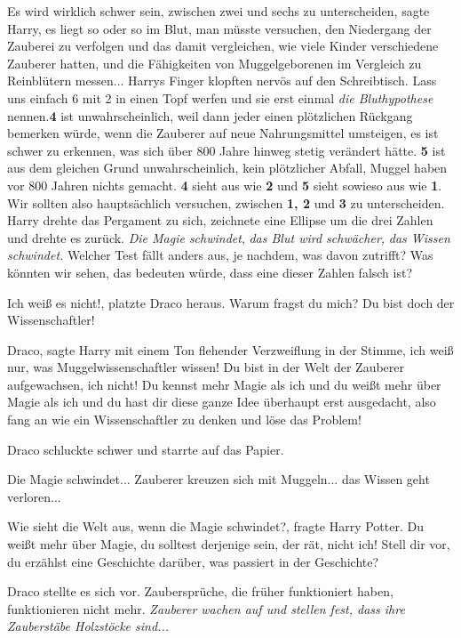 \glqq Es wird wirklich schwer sein, zwischen zwei und sechs zu
unterscheiden\grqq{}, sagte Harry, \glqq es liegt so oder so im Blut, man müsste
versuchen, den Niedergang der Zauberei zu verfolgen und das damit vergleichen,
wie viele Kinder verschiedene Zauberer hatten, und die Fähigkeiten von
Muggelgeborenen im Vergleich zu Reinblütern messen...\grqq{} Harrys Finger
klopften nervös auf den Schreibtisch. \glqq Lass uns einfach 6 mit 2 in einen
Topf werfen und sie erst einmal \emph{die Bluthypothese} nennen.\textbf{4 }ist
unwahrscheinlich, weil dann jeder einen plötzlichen Rückgang bemerken würde,
wenn die Zauberer auf neue Nahrungsmittel umsteigen, es ist schwer zu erkennen,
was sich über 800 Jahre hinweg stetig verändert hätte. \textbf{5 }ist aus dem
gleichen Grund unwahrscheinlich, kein plötzlicher Abfall, Muggel haben vor 800
Jahren nichts gemacht. \textbf{4} sieht aus wie \textbf{2} und \textbf{5} sieht
sowieso aus wie \textbf{1}. Wir sollten also hauptsächlich versuchen, zwischen
\textbf{1, 2} und \textbf{3} zu unterscheiden.\grqq{} Harry drehte das Pergament
zu sich, zeichnete eine Ellipse um die drei Zahlen und drehte es zurück. \glqq
\emph{Die Magie schwindet}, \emph{das Blut wird schwächer,} \emph{das Wissen
schwindet.} Welcher Test fällt anders aus, je nachdem, was davon zutrifft? Was
könnten wir sehen, das bedeuten würde, dass eine dieser Zahlen falsch
ist?\grqq{}

\glqq Ich weiß es nicht!\grqq{}, platzte Draco heraus. \glqq Warum fragst du
mich? Du bist doch der Wissenschaftler!\grqq{}

\glqq Draco\grqq{}, sagte Harry mit einem Ton flehender Verzweiflung in der
Stimme, \glqq ich weiß nur, was Muggelwissenschaftler wissen! Du bist in der
Welt der Zauberer aufgewachsen, ich nicht! Du kennst mehr Magie als ich und du
weißt mehr über Magie als ich und du hast dir diese ganze Idee überhaupt erst
ausgedacht, also fang an wie ein Wissenschaftler zu denken und löse das
Problem!\grqq{}

Draco schluckte schwer und starrte auf das Papier.

Die Magie schwindet... Zauberer kreuzen sich mit Muggeln... das Wissen geht
verloren...

\glqq Wie sieht die Welt aus, wenn die Magie schwindet?\grqq{}, fragte Harry
Potter. \glqq Du weißt mehr über Magie, du solltest derjenige sein, der rät,
nicht ich! Stell dir vor, du erzählst eine Geschichte darüber, was passiert in
der Geschichte?\grqq{}

Draco stellte es sich vor. \glqq Zaubersprüche, die früher funktioniert haben,
funktionieren nicht mehr.\grqq{} \emph{Zauberer wachen auf und stellen fest,
dass ihre Zauberstäbe Holzstöcke sind... }

